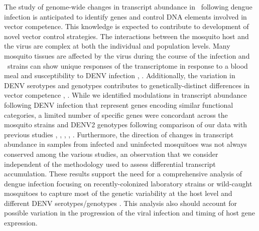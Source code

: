 The study of genome-wide changes in transcript abundance in \Aa\ following dengue infection is anticipated to identify genes and control DNA elements involved in vector competence.
This knowledge is expected to contribute to development of novel vector control strategies.
The interactions between the mosquito host and the virus are complex at both the individual and population levels.
Many mosquito tissues are affected by the virus during the course of the infection and \Aa\ strains can show unique responses of the transcriptome in response to a blood meal and susceptibility to \gls{DENV} infection \cite{Black2002}, \cite{bonizzoni2012strain}.
Additionally, the variation in \gls{DENV} serotypes and genotypes contributes to genetically-distinct differences in vector competence \cite{Anderson2006}, \cite{Weaver2009}.
While we identified modulations in transcript abundance following \gls{DENV} infection that represent genes encoding similar functional categories, a limited number of specific genes were concordant across the mosquito strains and \gls{DENV}2 genotypes following comparison of our data with previous studies \cite{Xi2008}, \cite{Luplertlop2011}, \cite{Behura2011}, \cite{Sim2012}, \cite{Colpitts2011}.
Furthermore, the direction of changes in transcript abundance in samples from infected and uninfected mosquitoes was not always conserved among the various studies, an observation that we consider independent of the methodology used to assess differential transcript accumulation.
These results support the need for a comprehensive analysis of dengue infection focusing on recently-colonized laboratory strains or wild-caught mosquitoes to capture most of the genetic variability at the host level and different \gls{DENV} serotypes/genotypes \cite{Armstrong2001}.
This analysis also should account for possible variation in the progression of the viral infection and timing of host gene expression.